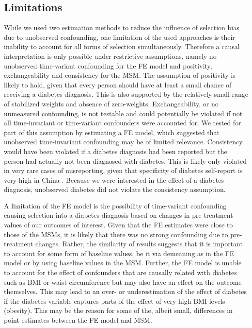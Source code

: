 \subsection{Limitations}

While we used two estimation methods to reduce the influence of selection bias due to unobserved confounding, one limitation of the used approaches is their inability to account for all forms of selection simultaneously. Therefore a causal interpretation is only possible under restrictive assumptions, namely no unobserved time-variant confounding for the \ac{FE} model and positivity, exchangeability and consistency for the \ac{MSM}. The assumption of positivity is likely to hold, given that every person should have at least a small chance of receiving a diabetes diagnosis. This is also supported by the relatively small range of stabilized weights and absence of zero-weights. Exchangeability, or no unmeasured confounding, is not testable and could potentially be violated if not all time-invariant or time-variant confounders were accounted for. We tested for part of this assumption by estimating a \ac{FE} model, which suggested that unobserved time-invariant confounding may be of limited relevance. Consistency would have been violated if a diabetes diagnosis had been reported but the person had actually not been diagnosed with diabetes. This is likely only violated in very rare cases of misreporting, given that specificity of diabetes self-report is very high in China \autocite{Yuan2015}. Because we were interested in the effect of a diabetes diagnosis, unobserved diabetes did not violate the consistency assumption.

A limitation of the \ac{FE} model is the possibility of time-variant confounding causing selection into a diabetes diagnosis based on changes in pre-treatment values of our outcomes of interest. Given that the \ac{FE} estimates were close to those of the \acp{MSM}, it is likely that there was no strong confounding due to pre-treatment changes. Rather, the similarity of results suggests that it is important to account for some form of baseline values, be it via demeaning as in the \ac{FE} model or by using baseline values in the \ac{MSM}.  Further, the \ac{FE} model is unable to account for the effect of confounders that are causally related with diabetes such as \ac{BMI} or waist circumference but may also have an effect on the outcome themselves. This may lead to an over- or underestimation of the effect of diabetes if the diabetes variable captures parts of the effect of very high \ac{BMI} levels (obesity). This may be the reason for some of the, albeit small, differences in point estimates between the \ac{FE} model and \ac{MSM}.

